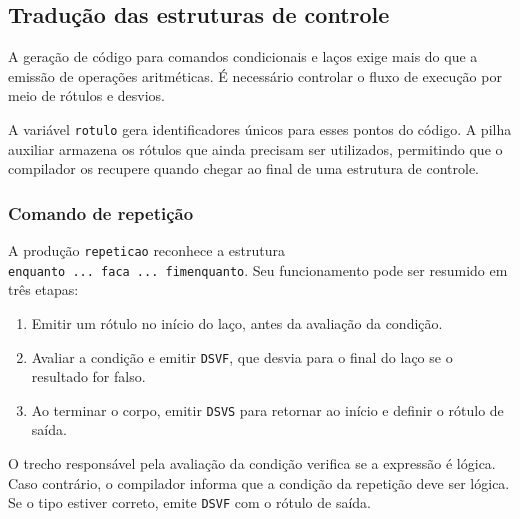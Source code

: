 \documentclass[
  brazilian,
  letterpaper,
]{book}
\providecommand{\tightlist}{%
  \setlength{\itemsep}{0pt}\setlength{\parskip}{0pt}}
\theoremstyle{plain}
\theoremstyle{definition}
\theoremstyle{remark}
\begin{document}
\subsection{Tradução das estruturas de
controle}\label{traduuxe7uxe3o-das-estruturas-de-controle}

A geração de código para comandos condicionais e laços exige mais do que
a emissão de operações aritméticas. É necessário controlar o fluxo de
execução por meio de rótulos e desvios.

A variável \texttt{rotulo} gera identificadores únicos para esses pontos
do código. A pilha auxiliar armazena os rótulos que ainda precisam ser
utilizados, permitindo que o compilador os recupere quando chegar ao
final de uma estrutura de controle.

\subsubsection{Comando de repetição}\label{comando-de-repetiuxe7uxe3o}

A produção \texttt{repeticao} reconhece a estrutura
\texttt{enquanto\ ...\ faca\ ...\ fimenquanto}. Seu funcionamento pode
ser resumido em três etapas:

\begin{enumerate}
\def\labelenumi{\arabic{enumi}.}
\tightlist
\item
  Emitir um rótulo no início do laço, antes da avaliação da condição.
\item
  Avaliar a condição e emitir \texttt{DSVF}, que desvia para o final do
  laço se o resultado for falso.
\item
  Ao terminar o corpo, emitir \texttt{DSVS} para retornar ao início e
  definir o rótulo de saída.
\end{enumerate}

O trecho responsável pela avaliação da condição verifica se a expressão
é lógica. Caso contrário, o compilador informa que a condição da
repetição deve ser lógica. Se o tipo estiver correto, emite
\texttt{DSVF} com o rótulo de saída.
\end{document}
